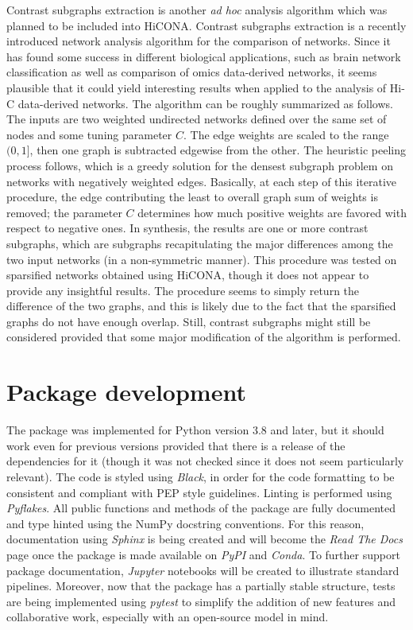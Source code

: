 Contrast subgraphs extraction is another \textit{ad hoc} analysis algorithm which was planned to be included into HiCONA. Contrast subgraphs extraction is a recently introduced network analysis algorithm for the comparison of networks. Since it has found some success in different biological applications, such as brain network classification as well as comparison of omics data-derived networks\cite{contrast2020, contrast2023}, it seems plausible that it could yield interesting results when applied to the analysis of Hi-C data-derived networks. The algorithm can be roughly summarized as follows. The inputs are two weighted undirected networks defined over the same set of nodes and some tuning parameter $C$. The edge weights are scaled to the range $(0,1]$, then one graph is subtracted edgewise from the other. The heuristic peeling process follows, which is a greedy solution for the densest subgraph problem on networks with negatively weighted edges. Basically, at each step of this iterative procedure, the edge contributing the least to overall graph sum of weights is removed; the parameter $C$ determines how much positive weights are favored with respect to negative ones. In synthesis, the results are one or more contrast subgraphs, which are subgraphs recapitulating the major differences among the two input networks (in a non-symmetric manner). This procedure was tested on sparsified networks obtained using HiCONA, though it does not appear to provide any insightful results. The procedure seems to simply return the difference of the two graphs, and this is likely due to the fact that the sparsified graphs do not have enough overlap. Still, contrast subgraphs might still be considered provided that some major modification of the algorithm is performed.


\section{Package development}

The package was implemented for Python version 3.8 and later, but it should work even for previous versions provided that there is a release of the dependencies for it (though it was not checked since it does not seem particularly relevant). 
The code is styled using \textit{Black}\cite{black2023}, in order for the code formatting to be consistent and compliant with PEP style guidelines\cite{pep2023}. Linting is performed using \textit{Pyflakes}\cite{pyflakes2023}.
All public functions and methods of the package are fully documented and type hinted using the NumPy docstring conventions. For this reason, documentation using \textit{Sphinx}\cite{sphinx2023} is being created and will become the \textit{Read The Docs} page once the package is made available on \textit{PyPI} and \textit{Conda}.
To further support package documentation, \textit{Jupyter}\cite{jupyter2023} notebooks will be created to illustrate standard pipelines. Moreover, now that the package has a partially stable structure, tests are being implemented using \textit{pytest}\cite{pytest2023} to simplify the addition of new features and collaborative work, especially with an open-source model in mind.

